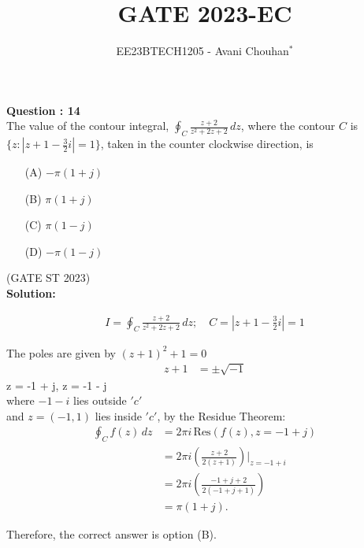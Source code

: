 \documentclass[journal,12pt,twocolumn]{IEEEtran}
\theoremstyle{remark}
\begin{document}

\vspace{3cm}

\title{GATE 2023-EC}
\author{EE23BTECH1205 - Avani Chouhan$^{*}$%
}
\maketitle
\newpage
\bigskip

\renewcommand{\thefigure}{\theenumi}
\renewcommand{\thetable}{\theenumi}

\vspace{3cm}
\textbf{Question : 14} \\
The value of the contour integral, $\oint_C \frac{z + 2}{z^2 + 2z + 2} \, dz$, where the contour $C$ is $\{ z : |z + 1 - \frac{3}{2}i| = 1 \}$, taken in the counter clockwise direction, is \\

\begin{enumerate}
  \item[(A)] $-\pi(1+j) $
  \item[(B)] $\pi(1+j)$
  \item[(C)] $\pi(1-j) $
  \item[(D)] $-\pi(1-j)$
\end{enumerate}

\hfill{(GATE ST 2023)}\\
\textbf{Solution:}

\begin{align}
I = \oint_{C} \frac{z + 2}{z^2 + 2z + 2} \, dz; \quad C = \left| z + 1 - \frac{3}{2}i \right| = 1 
\end{align}

The poles are given by $(z + 1)^2 + 1 = 0$\\
\begin{align}
    z + 1 &= \pm \sqrt{-1}
\end{align}
z = -1 + j, \quad z = -1 - j\\
where $-1 - i$ lies outside $'c'$ \\ and $z = (-1, 1)$ lies inside $'c'$, by the Residue Theorem:
\begin{align}
\oint_C f(z) \, dz &= 2\pi i \, \text{Res}(f(z), z=-1+j) \\
&= 2\pi i \left( \frac{z+2}{2(z+1)} \right) \bigg|_{z=-1+i} \\
&= 2\pi i \left( \frac {-1+j+2} {2(-1+j+1)} \right) \\
&= \pi (1+j).
\end{align}

Therefore, the correct answer is option (B).
\end{document}
